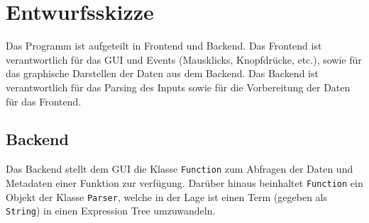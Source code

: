 \documentclass[12pt]{article}
\begin{document}
	\section*{Entwurfsskizze}

	Das Programm ist aufgeteilt in Frontend und Backend. Das Frontend ist verantwortlich für das GUI und Events (Mausklicks, Knopfdrücke, etc.),
	sowie für das graphische Darstellen der Daten aus dem Backend.
	Das Backend ist verantwortlich für das Parsing des Inputs sowie für die Vorbereitung der Daten für das Frontend.

	\subsection*{Backend}


	Das Backend stellt dem GUI die Klasse \texttt{Function} zum Abfragen der Daten und Metadaten einer Funktion zur verfügung.
	Darüber hinaus beinhaltet \texttt{Function} ein Objekt der Klasse \texttt{Parser}, welche in der Lage ist einen Term (gegeben als \texttt{String}) in einen
	Expression Tree umzuwandeln.
\end{document}
